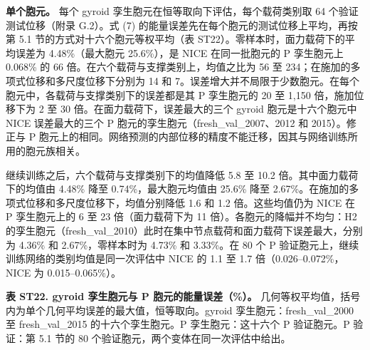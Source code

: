 \documentclass[preprint,12pt,authoryear]{elsarticle}
\begin{document}
\textbf{单个胞元。} 每个 gyroid 孪生胞元在恒等取向下评估，每个载荷类别取 64 个验证测试位移（附录 G.2）。式 (7) 的能量误差先在每个胞元的测试位移上平均，再按第 5.1 节的方式对十六个胞元等权平均（表 ST22）。零样本时，面力载荷下的平均误差为 4.48\%（最大胞元 25.6\%），是 NICE 在同一批胞元的 P 孪生胞元上 0.068\% 的 66 倍。在六个载荷与支撑类别上，均值之比为 56 至 234；在施加的多项式位移和多尺度位移下分别为 14 和 7。误差增大并不局限于少数胞元。在每个胞元中，各载荷与支撑类别下的误差都是其 P 孪生胞元的 20 至 1,150 倍，施加位移下为 2 至 30 倍。在面力载荷下，误差最大的三个 gyroid 胞元是十六个胞元中 NICE 误差最大的三个 P 胞元的孪生胞元（fresh\_val\_2007、2012 和 2015）。修正与 P 胞元上的相同。网络预测的内部位移的精度不能迁移，因其与网络训练所用的胞元族相关。

继续训练之后，六个载荷与支撑类别下的均值降低 5.8 至 10.2 倍。其中面力载荷下的均值由 4.48\% 降至 0.74\%，最大胞元均值由 25.6\% 降至 2.67\%。在施加的多项式位移和多尺度位移下，均值分别降低 1.6 和 1.2 倍。这些均值仍为 NICE 在 P 孪生胞元上的 6 至 23 倍（面力载荷下为 11 倍）。各胞元的降幅并不均匀：H2 的孪生胞元（fresh\_val\_2010）此时在集中节点载荷和面力载荷下误差最大，分别为 4.36\% 和 2.67\%，零样本时为 4.73\% 和 3.33\%。在 80 个 P 验证胞元上，继续训练网络的类别均值是同一次评估中 NICE 的 1.1 至 1.7 倍（0.026--0.072\%，NICE 为 0.015--0.065\%）。

\textbf{表 ST22. gyroid 孪生胞元与 P 胞元的能量误差（\%）。} 几何等权平均值，括号内为单个几何平均误差的最大值，恒等取向。gyroid 孪生胞元：fresh\_val\_2000 至 fresh\_val\_2015 的十六个孪生胞元。P 孪生胞元：这十六个 P 验证胞元。P 验证：第 5.1 节的 80 个验证胞元，两个变体在同一次评估中给出。
\end{document}
